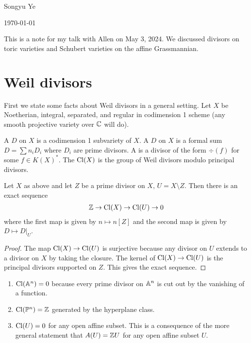 \documentclass[12pt]{article}
\begin{document}
Songyu Ye

\today

This is a note for my talk with Allen on May 3, 2024. We discussed divisors on toric varieties
and Schubert varieties on the affine Grassmannian.

\section{Weil divisors}
First we state some facts about Weil divisors in a general setting. 
Let $X$ be Noetherian, integral, separated, and regular in codimension 1 scheme (any 
smooth projective variety over $\mathbb{C}$ will do).  
\begin{definition}
    A  $D$ on $X$ is a codimension 1 subvariety of $X$.
    A  $D$ on $X$ is a formal sum $D = \sum n_i D_i$ where $D_i$ are prime divisors.
    A  is a divisor of the form $\div(f)$ for some $f\in K(X)^*$. 
    The  $\operatorname{Cl}(X)$ is the group of Weil divisors modulo principal divisors.
\end{definition}

\begin{lemma}
    Let $X$ as above and let $Z$ be a prime divisor on $X$, $U = X\setminus Z$.
     Then there is an exact sequence
    \begin{align*}
        \mathbb{Z}\to \operatorname{Cl}(X) \to \operatorname{Cl}(U) \to 0
    \end{align*}
    where the first map is given by $n\mapsto n[Z]$ and 
    the second map is given by $D\mapsto D|_U$.
\end{lemma}

\begin{proof}
    The map $\operatorname{Cl}(X)\to \operatorname{Cl}(U)$ is surjective because any divisor on $U$ extends to a divisor on $X$ by taking the closure.
    The kernel of $\operatorname{Cl}(X)\to \operatorname{Cl}(U)$ is the principal divisors supported on $Z$.
    This gives the exact sequence. 
\end{proof}

\begin{example}
    \begin{enumerate}
        \item $\operatorname{Cl}(\mathbb{A}^n) = 0$ because every prime divisor on $\mathbb{A}^n$ is cut out by the vanishing of a function.
        \item $\operatorname{Cl}(\mathbb{P}^n) = \mathbb{Z}$ generated by the hyperplane class.
        \item $\operatorname{Cl}(U) = 0$ for any open affine subset. This is a consequence of 
        the more general statement that $A(U) = \mathbb{Z} U$ for any open affine subset $U$.
    \end{enumerate}
\end{example}
\end{document}
